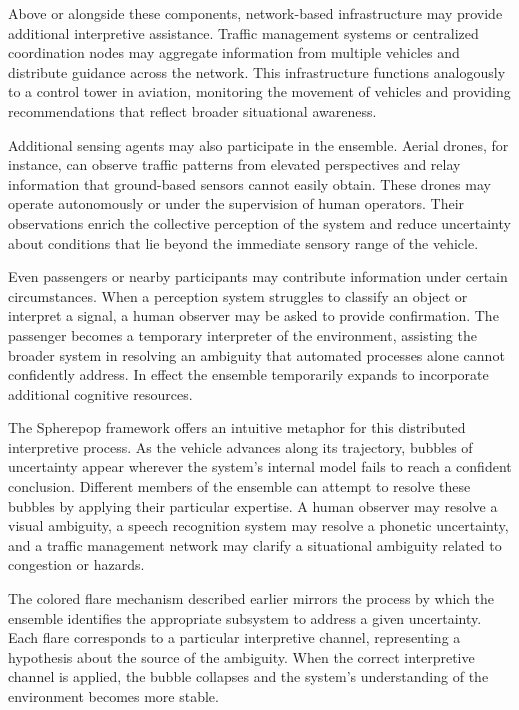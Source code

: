 \documentclass[11pt]{article}
\begin{document}
Above or alongside these components, network-based infrastructure may provide additional interpretive assistance. Traffic management systems or centralized coordination nodes may aggregate information from multiple vehicles and distribute guidance across the network. This infrastructure functions analogously to a control tower in aviation, monitoring the movement of vehicles and providing recommendations that reflect broader situational awareness.

Additional sensing agents may also participate in the ensemble. Aerial drones, for instance, can observe traffic patterns from elevated perspectives and relay information that ground-based sensors cannot easily obtain. These drones may operate autonomously or under the supervision of human operators. Their observations enrich the collective perception of the system and reduce uncertainty about conditions that lie beyond the immediate sensory range of the vehicle.

Even passengers or nearby participants may contribute information under certain circumstances. When a perception system struggles to classify an object or interpret a signal, a human observer may be asked to provide confirmation. The passenger becomes a temporary interpreter of the environment, assisting the broader system in resolving an ambiguity that automated processes alone cannot confidently address. In effect the ensemble temporarily expands to incorporate additional cognitive resources.

The Spherepop framework offers an intuitive metaphor for this distributed interpretive process. As the vehicle advances along its trajectory, bubbles of uncertainty appear wherever the system’s internal model fails to reach a confident conclusion. Different members of the ensemble can attempt to resolve these bubbles by applying their particular expertise. A human observer may resolve a visual ambiguity, a speech recognition system may resolve a phonetic uncertainty, and a traffic management network may clarify a situational ambiguity related to congestion or hazards.

The colored flare mechanism described earlier mirrors the process by which the ensemble identifies the appropriate subsystem to address a given uncertainty. Each flare corresponds to a particular interpretive channel, representing a hypothesis about the source of the ambiguity. When the correct interpretive channel is applied, the bubble collapses and the system’s understanding of the environment becomes more stable.
\end{document}
